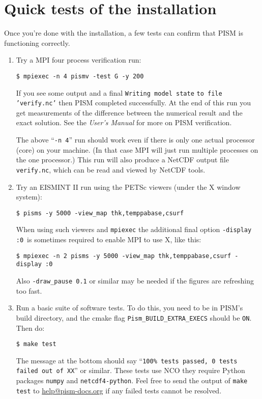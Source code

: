 \documentclass[titlepage,letterpaper,final]{scrartcl}
\begin{document}
\section{Quick tests of the installation}
Once you're done with the installation, a few tests can confirm that PISM is functioning correctly.
\begin{enumerate}
\item Try a MPI four process verification run:

\begin{verbatim}
$ mpiexec -n 4 pismv -test G -y 200
\end{verbatim}

  \noindent If you see some output and a final \texttt{Writing model state}
  \texttt{to file 'verify.nc'} then PISM completed
  successfully. At the end of this run you get measurements of the difference
  between the numerical result and the exact solution. See the \emph{User's
    Manual} for more on PISM verification.

  The above ``\texttt{-n 4}'' run should work even if there is only one actual
  processor (core) on your machine.  (In that case MPI will just run multiple
  processes on the one processor.)  This run will also produce a NetCDF output
  file \texttt{verify.nc}, which can be read and viewed by NetCDF tools.

\item Try an EISMINT II run using the PETSc viewers (under the X window system):

\begin{verbatim}
$ pisms -y 5000 -view_map thk,temppabase,csurf
\end{verbatim}

  \noindent When using such viewers and \texttt{mpiexec} the additional final
  option \texttt{-display :0} \,is sometimes required to enable MPI to use X,
  like this:

\begin{verbatim}
$ mpiexec -n 2 pisms -y 5000 -view_map thk,temppabase,csurf -display :0
\end{verbatim}

\noindent Also \texttt{-draw_pause 0.1} or similar may be needed if the figures
are refreshing too fast.

\item Run a basic suite of software tests.  To do this, you need to be in PISM's
build directory, and the cmake flag \texttt{Pism_BUILD_EXTRA_EXECS} should be
\texttt{ON}.  Then do:
\begin{verbatim}
$ make test
\end{verbatim}
The message at the bottom should say ``\texttt{100\% tests passed, 0 tests
failed out of XX}'' or similar.  These tests use NCO they require
Python packages \texttt{numpy} and \texttt{netcdf4-python}.  Feel free to
send the output of \texttt{make test} to
\href{mailto:help@pism-docs.org}{help@pism-docs.org} if any failed tests cannot
be resolved.
\end{enumerate}
\end{document}
